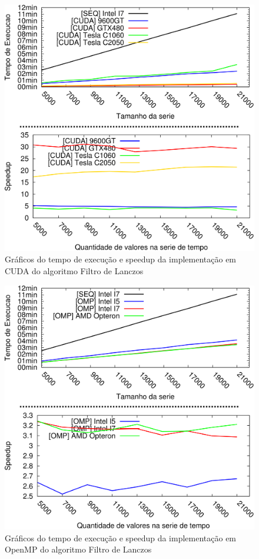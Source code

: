 \begin{figure}[H]
\centering
\includegraphics[]{Imagens/graficos_lanczos/lanczos_cuda.png}
\caption{Gráficos do tempo de execução e speedup da implementação em CUDA do algoritmo Filtro de Lanczos}
\label{fig:graficos_lanczos_cuda}
\end{figure}

\begin{figure}[H]
\centering
\includegraphics[]{Imagens/graficos_lanczos/lanczos_omp.png}
\caption{Gráficos do tempo de execução e speedup da implementação em OpenMP do algoritmo Filtro de Lanczos}
\label{fig:graficos_lanczos_omp}
\end{figure}

